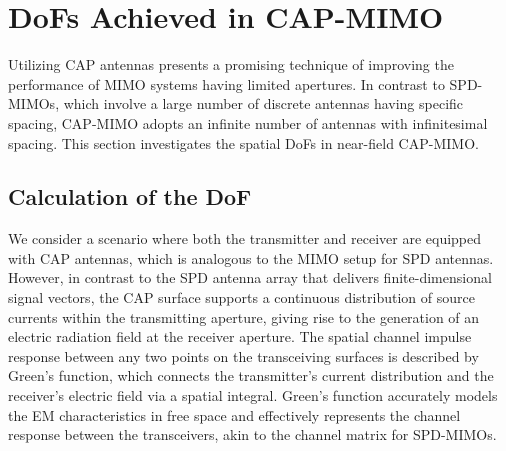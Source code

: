 \documentclass[journal]{IEEEtran}
\theoremstyle{definition}
\begin{document}


\section{DoFs Achieved in CAP-MIMO}
Utilizing CAP antennas presents a promising technique of improving the performance of MIMO systems having limited apertures.
In contrast to SPD-MIMOs, which involve a large number of discrete antennas having specific spacing, CAP-MIMO adopts an infinite number of antennas with infinitesimal spacing. %
This section investigates the spatial DoFs in near-field CAP-MIMO.
\subsection{Calculation of the DoF}
We consider a scenario where both the transmitter and receiver are equipped with CAP antennas, which is analogous to the MIMO setup for SPD antennas. However, in contrast to the SPD antenna array that delivers finite-dimensional signal vectors, the CAP surface supports a continuous distribution of source currents within the transmitting aperture, giving rise to the generation of an electric radiation field at the receiver aperture. The spatial channel impulse response between any two points on the transceiving surfaces is described by Green's function, which connects the transmitter's current distribution and the receiver's electric field via a spatial integral. Green's function accurately models the EM characteristics in free space and effectively represents the channel response between the transceivers, akin to the channel matrix for SPD-MIMOs.
\end{document}
